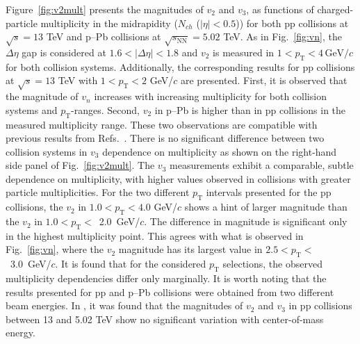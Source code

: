 Figure~\ref{fig:v2mult} presents the magnitudes of $v_2$ and $v_3$, as functions of charged-particle multiplicity in the midrapidity ($N_{ch}$ ($|\eta|<0.5$)) for both pp collisions at $\sqrt{s}=13$ TeV and p--Pb collisions at $\sqrt{s_\mathrm{NN}}=5.02$ TeV. As in Fig.~\ref{fig:vn}, the $\Delta\eta$ gap is considered at $1.6<|\Delta\eta|<1.8$ and $v_2$ is measured in $1<p_{\mathrm{T}}<4\,\mathrm{GeV}/c$ for both collision systems. Additionally, the corresponding results for pp collisions at $\sqrt{s}=13$ TeV with $1<p_{\mathrm{T}}<2$ GeV/$c$ are presented. First, it is observed that the magnitude of $v_n$ increases with increasing multiplicity for both collision systems and $p_\mathrm{T}$-ranges. Second, $v_2$ in p--Pb is higher than in pp collisions in the measured multiplicity range. These two observations are compatible with previous results from Refs.~\cite{ATLAS:2015hzw,ATLAS:2016yzd, Khachatryan:2015lva}. There is no significant difference between two collision systems in $v_3$ dependence on multiplicity as shown on the right-hand side panel of Fig.~\ref{fig:v2mult}. The $v_3$ measurements exhibit a comparable, subtle dependence on multiplicity, with higher values observed in collisions with greater particle multiplicities.
For the two different $p_\mathrm{T}$ intervals presented for the pp collisions, the $v_2$ in $1.0<p_\mathrm{T}<4.0$ GeV/$c$ shows a hint of larger magnitude than the $v_2$ in $1.0<p_\mathrm{T}<$~2.0~GeV/$c$. The difference in magnitude is significant only in the highest multiplicity point. 
This agrees with what is observed in Fig.~\ref{fig:vn}, where the $v_2$ magnitude has its largest value in $2.5<p_\mathrm{T}<$~3.0~GeV/$c$. It is found that for the considered $p_\mathrm{T}$ selections, the observed multiplicity dependencies differ only marginally. 
It is worth noting that the results presented for pp and p--Pb collisions were obtained from two different beam energies. In \cite{ATLAS:2016yzd}, it was found that the magnitudes of $v_2$ and $v_3$ in pp collisions between 13 and 5.02 TeV show no significant variation with center-of-mass energy.

